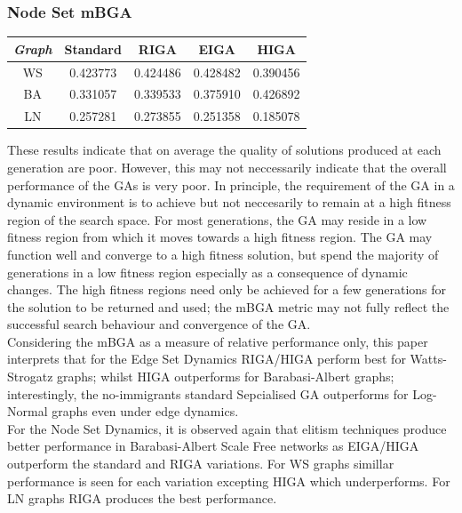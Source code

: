 \documentclass[
	a4paper, %
	10pt, %
	unnumberedsections, %
	twoside, %
]{LTJournalArticle}
\begin{document}
\subsubsection{Node Set mBGA}

\begin{center}
\begin{tabular}{||c c c c c||} 
 \hline
 \emph{Graph} & Standard & RIGA & EIGA & HIGA \\ [0.5ex] 
 \hline\hline
 WS & 0.423773 & 0.424486 & 0.428482 & 0.390456 \\ 
 \hline
 BA & 0.331057 & 0.339533 & 0.375910 & 0.426892 \\
 \hline
 LN & 0.257281 & 0.273855 & 0.251358 & 0.185078 \\
\end{tabular}
\end{center}

These results indicate that on average the quality of solutions produced at each generation are poor. However, this may not neccessarily indicate that the overall performance of the GAs is very poor. In principle, the requirement of the GA in a dynamic environment is to achieve but not neccesarily to remain at a high fitness region of the search space. For most generations, the GA may reside in a low fitness region from which it moves towards a high fitness region. The GA may function well and converge to a high fitness solution, but spend the majority of generations in a low fitness region especially as a consequence of dynamic changes. The high fitness regions need only be achieved for a few generations for the solution to be returned and used; the mBGA metric may not fully reflect the successful search behaviour and convergence of the GA. \\

Considering the mBGA as a measure of relative performance only, this paper interprets that for the Edge Set Dynamics RIGA/HIGA perform best for Watts-Strogatz graphs; whilst HIGA outperforms for Barabasi-Albert graphs; interestingly, the no-immigrants standard Sepcialised GA outperforms for Log-Normal graphs even under edge dynamics. \\

For the Node Set Dynamics, it is observed again that elitism techniques produce better performance in Barabasi-Albert Scale Free networks as EIGA/HIGA outperform the standard and RIGA variations. For WS graphs simillar performance is seen for each variation excepting HIGA which underperforms. For LN graphs RIGA produces the best performance.\\
\end{document}
